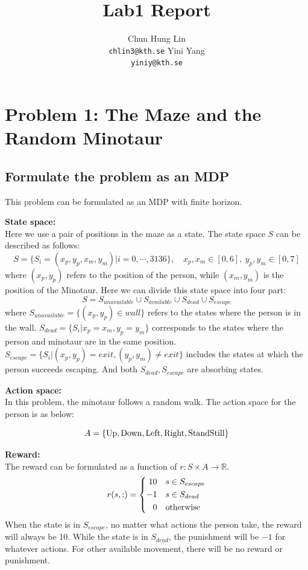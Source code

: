 \documentclass{article}
\title{Lab1 Report}
\author{
  Chun Hung Lin \\
  \texttt{chlin3@kth.se}
  \And
  Yini Yang \\
  \texttt{yiniy@kth.se}
}
\begin{document}
\maketitle

\section{Problem 1: The Maze and the Random Minotaur}
\subsection{Formulate the problem as an MDP}

This problem can be formulated as an MDP with finite horizon.

\textbf{State space:} \\
Here we use a pair of positions in the maze as a state. The state space $S$ can be described as follows:
$$S=\{S_i=(x_p,y_p,x_m,y_m)|i=0,\cdots,3136\}, \quad x_p,x_m\in [0,6],\  y_p,y_m\in [0,7]$$
where $(x_p,y_p)$ refers to the position of the person, while $(x_m,y_m)$ is the position of the Minotaur.
Here we can divide this state space into four part:
$$S=S_{unavailable}\cup S_{available}\cup S_{dead}\cup S_{escape}$$
where $S_{unavailable}=\{(x_p,y_p)\in wall\}$ refers to the states where the person is in the wall.
$S_{dead}=\{S_i|x_p=x_m,y_p=y_m\}$ corresponds to the states where the person and minotaur are in the same position.
$S_{escape}=\{S_i|(x_p,y_p)=exit,(y_p,y_m)\neq exit\}$ includes the states at which the person succeeds escaping.
And both $S_{dead}, S_{escape}$ are absorbing states.
\newline

\textbf{Action space:} \\
In this problem, the minotaur follows a random walk. The action space for the person is as below:

\begin{equation*}
  A=\{\textup{Up},\textup{Down},\textup{Left},\textup{Right},\textup{StandStill}\}
\end{equation*}

\textbf{Reward:} \\
The reward can be formulated as a function of $r: S\times A\rightarrow \mathbb{R}$.
$$r(s,:)=\left\{\begin{aligned}
 10 \quad &s\in S_{escape} \\
 -1 \quad &s\in S_{dead} \\
 0 \quad &\textup{otherwise}
\end{aligned}\right.$$
When the state is in $S_{escape}$, no matter what actions the person take, the reward will always be 10.
While the state is in $S_{dead}$, the punishment will be $-1$ for whatever actions.
For other available movement, there will be no reward or punishment.
\newline
\end{document}
